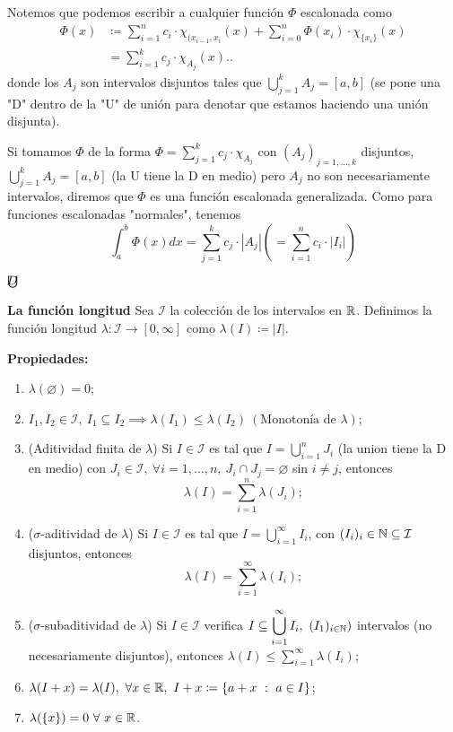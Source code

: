 \documentclass[a4paper]{report}
\newcommand{\bigcupcolon}{\mathop{\ThisStyle{%
  \ensurestackMath{\stackinset{c}{-0.4pt}{c}{+.25\LMex}{\tiny{D}}{\SavedStyle\bigcup}}}}}
\begin{document}
	Notemos que podemos escribir a cualquier función $\Phi$ escalonada como
	\begin{align*}
		\Phi (x) & \coloneq \sum_{i=1}^{n} c_i \cdot \chi_{(x_{i-1},x_i}(x) + \sum_{i=0}^{n} \Phi(x_i) \cdot \chi_{\{x_i\}}(x) \\
		& = \sum_{i=1}^{k} c_j \cdot \chi_{A_j}(x).
	.\end{align*}
	\noindent donde los $A_j$ son intervalos disjuntos tales que $\displaystyle\bigcup_{j=1}^{k} A_j = [a,b]$ (se pone una "D" dentro de la "U" de unión para denotar que estamos haciendo una unión disjunta).

	Si tomamos $\Phi$ de la forma $\Phi = \sum_{j=1}^{k} c_j \cdot \chi_{A_j}$ con $(A_j)_{j=1,\dots,k}$ disjuntos, $\displaystyle\bigcup_{j=1}^{k} A_j = [a,b]$ (la U tiene la D en medio) pero $A_j$  no son necesariamente intervalos, diremos que $\Phi$ es una función escalonada generalizada. Como para funciones escalonadas "normales", tenemos
	\[
	\int_{a}^{b} \Phi (x) dx = \sum_{j=1}^{k} c_j \cdot |A_j| \left( = \sum_{i=1}^{n} c_i \cdot |I_i| \right)
	\]

	$\bigcupcolon$

	\noindent \textbf{La función longitud}
	Sea $\mathcal{I}$ la colección de los intervalos en $\mathbb{R}$. Definimos la función longitud $\lambda : \mathcal{I} \to [0,\infty]$ como $\lambda (I) \coloneq |I|$.
	
	\noindent \textbf{Propiedades:}
	\begin{enumerate}
		\item $\lambda (\varnothing) = 0$;

		\item $I_1,I_2 \in \mathcal{I},\ I_1\subseteq I_2 \implies \lambda (I_1) \leq \lambda (I_2) \ (\text{Monotonía de } \lambda)$;

		\item (Aditividad finita de $\lambda$) Si $I \in \mathcal{I}$ es tal que $I = \displaystyle\bigcup_{i=1}^{n} J_i$ (la union tiene la D en medio) con $J_i \in \mathcal{I},\ \forall i = 1,\dots,n,\ J_i \cap J_j = \varnothing$ sin $i\neq j$, entonces
		\[
		\lambda (I) = \sum_{i=1}^{n} \lambda (J_i);
		\]

		\item ($\sigma$-aditividad de $\lambda$) Si $I \in \mathcal{I}$ es tal que $I = \displaystyle\bigcup_{i=1}^{\infty} I_i $, con $(I_i)_{i} \in \mathbb{N} \subseteq \mathcal{I}$ disjuntos, entonces
		\[
		\lambda(I) = \sum_{i=1}^{\infty} \lambda (I_i)
		;\]

		\item ($\sigma$-subaditividad de $\lambda$) Si $I \in \mathcal{I}$ verifica $I \subseteq \displaystyle\bigcup_{i=1}^{\infty} I_i, \ (I_1)_{i \in \mathbb{N}})$ intervalos (no necesariamente disjuntos), entonces $\lambda (I) \leq \sum_{i=1}^{\infty} \lambda (I_i)$;

		\item $\lambda (I + x) = \lambda (I), \ \forall x \in \mathbb{R}, \ I+x \coloneq \{a + x \ : \ a \in I \} $;

		\item $\lambda(\{x\}) = 0 \ \forall \ x \in \mathbb{R}$.  
	\end{enumerate}
\end{document}
